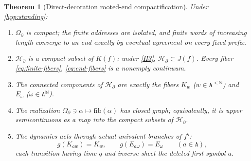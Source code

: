 \documentclass[11pt,reqno]{amsart}
\numberwithin{equation}{section}
\theoremstyle{plain}
\newtheorem{theorem}{Theorem}[section]
\theoremstyle{definition}
\theoremstyle{remark}
\newcommand{\N}{\mathbb N}
\newcommand{\A}{\mathtt A}
\newcommand{\Words}{\A^{<\N}}
\newcommand{\Ends}{\A^{\N}}
\newcommand{\OmB}{\Omega_\partial}
\newcommand{\HB}{\mathcal H_\partial}
\begin{document}
\begin{theorem}[Direct-decoration rooted-end compactification]
\label{thm:compactification}
Under \cref{hyp:standing}:
\begin{enumerate}[label=\textup{(\roman*)}]
 \item \label{cpt:address} $\OmB$ is compact; the finite addresses are
  isolated, and finite words of increasing length converge to an end
  exactly by eventual agreement on every fixed prefix.
 \item \label{cpt:compact} $\HB$ is a compact subset of $K(f)$; under
  \ref{H3}, $\HB\subset J(f)$.  Every fiber \eqref{eq:finite-fibers},
  \eqref{eq:end-fibers} is a nonempty continuum.
 \item \label{cpt:components} The connected components of $\HB$ are
  exactly the fibers $K_w$ ($w\in\Words$) and $E_\omega$
  ($\omega\in\Ends$).
 \item \label{cpt:usc} The realization
  $\OmB\ni\alpha\mapsto\mathrm{fib}(\alpha)$ has closed graph;
  equivalently, it is upper semicontinuous as a map into the compact
  subsets of $\HB$.
 \item \label{cpt:action} The dynamics acts through actual univalent
  branches of $f^q$:
  \begin{equation}
   g(K_{aw})=K_w,
   \qquad
   g(E_{a\omega})=E_\omega
   \qquad(a\in\A),
  \label{eq:equivariance}
  \end{equation}
  each transition having time $q$ and inverse sheet the deleted first
  symbol $a$.
\end{enumerate}
\end{theorem}
\end{document}
